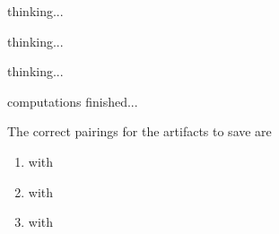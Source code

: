 \documentclass[white]{guildcamp3}
\begin{document}
\name{\wEndWorldTwo{}} %

thinking...

thinking...

thinking...

computations finished...

The correct pairings for the artifacts to save \bMagicWorld{} are

\begin{enumerate}
	\item \iMagicArtifactOne{} with \iTechArtifactOne{}

	\item \iMagicArtifactTwo{} with \iTechArtifactThree{}

	\item \iMagicArtifactThree{} with \iTechArtifactTwo{}
\end{enumerate}

\end{document}
